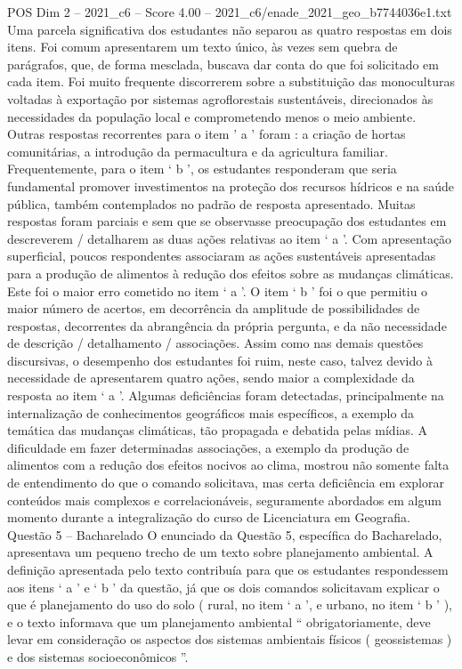 \begin{textsample}{POS Dim 2 – 2021\_c6 – Score 4.00 – 2021\_c6/enade\_2021\_geo\_b7744036e1.txt}
Uma parcela significativa dos estudantes não separou as quatro respostas em dois itens.
Foi comum apresentarem um texto único, às vezes sem quebra de parágrafos, que, de forma mesclada, buscava dar conta do que foi solicitado em cada item.
Foi muito frequente discorrerem sobre a substituição das monoculturas voltadas à exportação por sistemas agroflorestais sustentáveis, direcionados às necessidades da população local e comprometendo menos o meio ambiente.
Outras respostas recorrentes para o item ’ a ’ foram : a criação de hortas comunitárias, a introdução da permacultura e da agricultura familiar.
Frequentemente, para o item ‘ b ’, os estudantes responderam que seria fundamental promover investimentos na proteção dos recursos hídricos e na saúde pública, também contemplados no padrão de resposta apresentado.
Muitas respostas foram parciais e sem que se observasse preocupação dos estudantes em descreverem / detalharem as duas ações relativas ao item ‘ a ’.
Com apresentação superficial, poucos respondentes associaram as ações sustentáveis apresentadas para a produção de alimentos à redução dos efeitos sobre as mudanças climáticas.
Este foi o maior erro cometido no item ‘ a ’.
O item ‘ b ’ foi o que permitiu o maior número de acertos, em decorrência da amplitude de possibilidades de respostas, decorrentes da abrangência da própria pergunta, e da não necessidade de descrição / detalhamento / associações.
Assim como nas demais questões discursivas, o desempenho dos estudantes foi ruim, neste caso, talvez devido à necessidade de apresentarem quatro ações, sendo maior a complexidade da resposta ao item ‘ a ’.
Algumas deficiências foram detectadas, principalmente na internalização de conhecimentos geográficos mais específicos, a exemplo da temática das mudanças climáticas, tão propagada e debatida pelas mídias.
A dificuldade em fazer determinadas associações, a exemplo da produção de alimentos com a redução dos efeitos nocivos ao clima, mostrou não somente falta de entendimento do que o comando solicitava, mas certa deficiência em explorar conteúdos mais complexos e correlacionáveis, seguramente abordados em algum momento durante a integralização do curso de Licenciatura em Geografia.
Questão 5 – Bacharelado O enunciado da Questão 5, específica do Bacharelado, apresentava um pequeno trecho de um texto sobre planejamento ambiental.
A definição apresentada pelo texto contribuía para que os estudantes respondessem aos itens ‘ a ’ e ‘ b ’ da questão, já que os dois comandos solicitavam explicar o que é planejamento do uso do solo ( rural, no item ‘ a ’, e urbano, no item ‘ b ’ ), e o texto informava que um planejamento ambiental “ obrigatoriamente, deve levar em consideração os aspectos dos sistemas ambientais físicos ( geossistemas ) e dos sistemas socioeconômicos ”.

\end{textsample}
